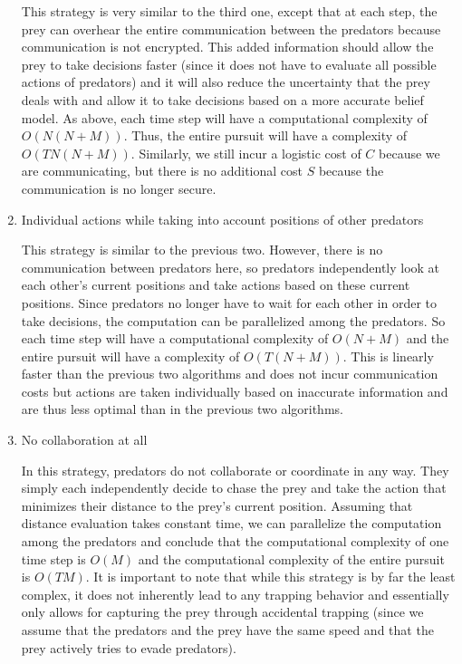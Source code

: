 \documentclass[11pt]{article}
\begin{document}
\begin{enumerate}[leftmargin=0.25cm]
	This strategy is very similar to the third one, except that at each step, the prey can overhear the entire communication between the predators because communication is not encrypted. This added information should allow the prey to take decisions faster (since it does not have to evaluate all possible actions of predators) and it will also reduce the uncertainty that the prey deals with and allow it to take decisions based on a more accurate belief model. As above, each time step will have a computational complexity of $O(N(N+M))$. Thus, the entire pursuit will have a complexity of $O(TN(N+M))$. Similarly, we still incur a logistic cost of $C$ because we are communicating, but there is no additional cost $S$ because the communication is no longer secure. 
	
	\item Individual actions while taking into account positions of other predators
	
	This strategy is similar to the previous two. However, there is no communication between predators here, so predators independently look at each other's current positions and take actions based on these current positions. Since predators no longer have to wait for each other in order to take decisions, the computation can be parallelized among the predators. So each time step will have a computational complexity of $O(N+M)$ and the entire pursuit will have a complexity of $O(T(N+M))$. This is linearly faster than the previous two algorithms and does not incur communication costs but actions are taken individually based on inaccurate information and are thus less optimal than in the previous two algorithms. 
	
	\item No collaboration at all
	
	In this strategy, predators do not collaborate or coordinate in any way. They simply each independently decide to chase the prey and take the action that minimizes their distance to the prey's current position. Assuming that distance evaluation takes constant time, we can parallelize the computation among the predators and conclude that the computational complexity of one time step is $O(M)$ and the computational complexity of the entire pursuit is $O(TM)$. It is important to note that while this strategy is by far the least complex, it does not inherently lead to any trapping behavior and essentially only allows for capturing the prey through accidental trapping (since we assume that the predators and the prey have the same speed and that the prey actively tries to evade predators).  
\end{enumerate}
\end{document}
